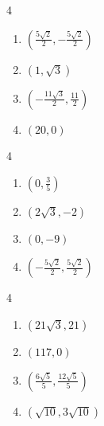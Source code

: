 \documentclass{ximera}
\begin{document}
\begin{multicols}{4}

\begin{enumerate}

\setcounter{enumi}{\value{HW}}

\item $\left( \frac{5\sqrt{2}}{2}, -\frac{5\sqrt{2}}{2} \right)$
\item $\left( 1, \sqrt{3} \right)$ 
\item $\left( -\frac{11\sqrt{3}}{2}, \frac{11}{2} \right)$
\item $\left( 20, 0 \right)$ 

\setcounter{HW}{\value{enumi}}

\end{enumerate}

\end{multicols}

\begin{multicols}{4} 

\begin{enumerate}

\setcounter{enumi}{\value{HW}}

\item $\left( 0, \frac{3}{5} \right)$ 
\item $\left( 2\sqrt{3}, -2 \right)$ 
\item $\left( 0, -9 \right)$ 
\item $\left( -\frac{5\sqrt{2}}{2}, \frac{5\sqrt{2}}{2} \right)$

\setcounter{HW}{\value{enumi}}

\end{enumerate}

\end{multicols}

\begin{multicols}{4} 

\begin{enumerate}

\setcounter{enumi}{\value{HW}}

\item $\left( 21\sqrt{3}, 21 \right)$ 
\item $\left(117, 0 \right)$ 
\item $\left( \frac{6\sqrt{5}}{5}, \frac{12\sqrt{5}}{5} \right)$ 
\item $\left(\sqrt{10}, 3\sqrt{10} \right)$ 

\setcounter{HW}{\value{enumi}}

\end{enumerate}

\end{multicols}
\end{document}
